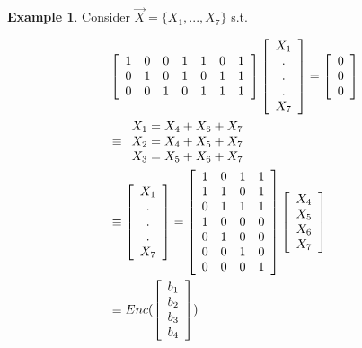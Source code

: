 \documentclass[twoside]{article}
\theoremstyle{definition} %
\newtheorem{example}{Example}
\begin{document}
\begin{example}
  Consider $\vec{X} = \{ X_1, ..., X_7\}$ s.t.

  \begin{align*}
    &\left[
    \begin{array}{c c c c c c c}
      1 & 0 & 0 & 1 & 1 & 0 & 1 \\
      0 & 1 & 0 & 1 & 0 & 1 & 1 \\
      0 & 0 & 1 & 0 & 1 & 1 & 1
    \end{array}
    \right]
    \left[
    \begin{array}{c}
      X_1 \\
      . \\
      . \\
      . \\
      X_7
    \end{array}
    \right]
    =
    \left[
    \begin{array}{c}
      0 \\
      0 \\
      0
    \end{array}
    \right] \\
    &\equiv
    \begin{array}{l l}
      X_1 = X_4 + X_6 + X_7 \\
      X_2 = X_4 + X_5 + X_7 \\
      X_3 = X_5 + X_6 + X_7
    \end{array}\\
    &\equiv
    \left[
    \begin{array}{c}
      X_1 \\
      . \\
      . \\
      . \\
      X_7
    \end{array}
    \right]
    =
    \left[
    \begin{array}{c c c c}
      1 & 0 & 1 & 1 \\
      1 & 1 & 0 & 1 \\
      0 & 1 & 1 & 1 \\
      1 & 0 & 0 & 0 \\
      0 & 1 & 0 & 0 \\
      0 & 0 & 1 & 0 \\
      0 & 0 & 0 & 1 \\
    \end{array}
    \right]
    \left[
    \begin{array}{c}
      X_4 \\
      X_5 \\
      X_6 \\
      X_7
    \end{array}
    \right] \\
    &\equiv Enc(
    \left[
    \begin{array}{c}
      b_1 \\
      b_2 \\
      b_3 \\
      b_4
    \end{array}
    \right]
    )
  \end{align*}
\end{example}
\end{document}
